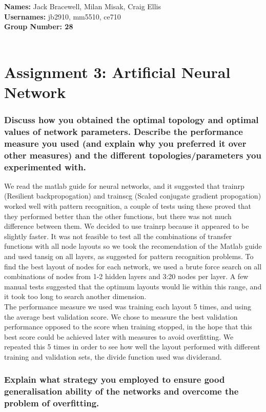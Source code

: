 \documentclass[12pt]{article}
\begin{document}
{\bf Names:} Jack Bracewell, Milan Misak, Craig Ellis \\
{\bf Usernames:} jb2910, mm5510, ce710 \\
{\bf Group Number: 28}  \\ \\

\section*{Assignment 3: Artificial Neural Network}

\subsubsection*{Discuss how you obtained the optimal topology and optimal values of network parameters. Describe the performance measure you used (and explain why you preferred it over other measures) and the different topologies/parameters you experimented with.}

We read the matlab guide for neural networks, and it suggested that trainrp (Resilient backpropogation) and trainscg (Scaled conjugate gradient propogation) worked well with pattern recognition, a couple of tests using these proved that they performed better than the other functions, but there was not much difference between them. We decided to use trainrp because it appeared to be slightly faster. It was not feasible to test all the combinations of transfer functions with all node layouts so we took the recomendation of the Matlab guide and used tansig on all layers, as suggested for pattern recognition problems. To find the best layout of nodes for each network, we used a brute force search on all combinations of nodes from 1-2 hidden layers and 3:20 nodes per layer. A few manual tests suggested that the optimum layouts would lie within this range, and it took too long to search another dimension.\\
The performance measure we used was training each layout 5 times, and using the average best validation score. We chose to measure the best validation performance opposed to the score when training stopped, in the hope that this best score could be achieved later with measures to avoid overfitting. We repeated this 5 times in order to see how well the layout performed with different training and validation sets, the divide function used was dividerand.


\subsubsection*{Explain what strategy you employed to ensure good generalisation ability of the networks and overcome the problem of overfitting.}
\end{document}
